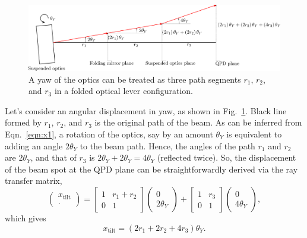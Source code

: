 \begin{figure}[!h]
	\centering
	\includegraphics[width=181mm]{figures/folded_optical_lever_rtm}
	\caption{A yaw of the optics can be treated as three path segments $r_1$, $r_2$, and $r_3$ in a folded optical lever configuration.}
	\label{fig:foldedopticalleverrtm}
\end{figure}
Let's consider an angular displacement in yaw, as shown in Fig.~\ref{fig:foldedopticalleverrtm}.
Black line formed by $r_1$, $r_2$, and $r_3$ is the original path of the beam.
As can be inferred from Eqn.~\eqref{eqn:x1}, a rotation of the optics, say by an amount $\theta_Y$ is equivalent to adding an angle $2\theta_Y$ to the beam path.
Hence, the angles of the path $r_1$ and $r_2$ are $2\theta_Y$, and that of $r_3$ is $2\theta_Y + 2\theta_Y=4\theta_Y$ (reflected twice).
So, the displacement of the beam spot at the QPD plane can be straightforwardly derived via the ray transfer matrix,
\begin{equation}
	\begin{pmatrix}
		x_\mathrm{tilt}\\
		\cdot
	\end{pmatrix}
	=
	\begin{bmatrix}
		1 & r_1+r_2\\
		0 & 1
	\end{bmatrix}
	\begin{pmatrix}
		0\\
		2\theta_Y
	\end{pmatrix}
	+
	\begin{bmatrix}
		1 & r_3\\
		0 & 1
	\end{bmatrix}
	\begin{pmatrix}
		0\\
		4\theta_Y
	\end{pmatrix},
\end{equation}
which gives
\begin{equation}
	x_\mathrm{tilt} = \left(2r_1+2r_2+4r_3\right)\theta_Y.
\end{equation}

